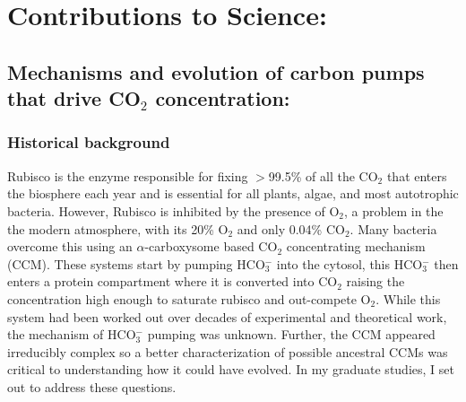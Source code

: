 \documentclass{article}
\begin{document}
\section*{Contributions to Science:}
\newrefsection
\subsection{Mechanisms and evolution of carbon pumps that drive CO$_2$ concentration:}
\subsubsection{Historical background}
Rubisco is the enzyme responsible for fixing $>$99.5\% of all the CO$_2$ that enters the biosphere each year and is essential for all plants, algae, and most autotrophic bacteria. 
However, Rubisco is inhibited by the presence of O$_2$, a problem in the the modern atmosphere, with its 20\% O$_2$ and only 0.04\% CO$_2$.
Many bacteria overcome this using an $\alpha$-carboxysome based CO$_2$ concentrating mechanism (CCM).
These systems start by pumping HCO$_{3}^{-}$ into the cytosol, this HCO$_{3}^{-}$ then enters a protein compartment where it is converted into CO$_2$ raising the concentration high enough to saturate rubisco and out-compete O$_2$.
While this system had been worked out over decades of experimental and theoretical work, the mechanism of HCO$_{3}^{-}$ pumping was unknown.
Further, the CCM appeared irreducibly complex so a better characterization of possible ancestral CCMs was critical to understanding how it could have evolved.
In my graduate studies, I set out to address these questions.
%
\end{document}
